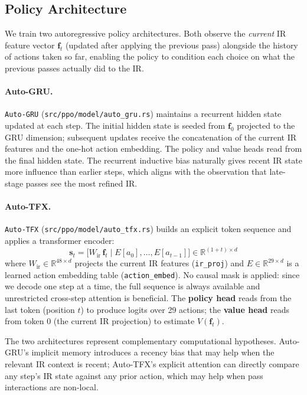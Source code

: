 \documentclass[conference]{IEEEtran}
\begin{document}
\subsection{Policy Architecture}
\label{sec:arch}
We train two autoregressive policy architectures.
Both observe the \emph{current} IR feature vector $\mathbf{f}_t$ (updated
after applying the previous pass) alongside the history of actions taken so
far, enabling the policy to condition each choice on what the previous passes
actually did to the IR.

\paragraph{Auto-GRU.}
\texttt{Auto-GRU} (\texttt{src/ppo/model/auto\_gru.rs}) maintains a recurrent
hidden state updated at each step.
The initial hidden state is seeded from $\mathbf{f}_0$ projected to the GRU
dimension; subsequent updates receive the concatenation of the current IR
features and the one-hot action embedding.
The policy and value heads read from the final hidden state.
The recurrent inductive bias naturally gives recent IR state more influence
than earlier steps, which aligns with the observation that late-stage passes
see the most refined IR.

\paragraph{Auto-TFX.}
\texttt{Auto-TFX} (\texttt{src/ppo/model/auto\_tfx.rs}) builds an explicit
token sequence and applies a transformer encoder:
%
\begin{equation}
\mathbf{s}_t = \bigl[W_{\text{ir}}\,\mathbf{f}_t \;\big|\;
               E[a_0], \ldots, E[a_{t-1}]\bigr]
               \in \mathbb{R}^{(1+t)\times d}
\label{eq:tokens}
\end{equation}
%
where $W_{\text{ir}} \in \mathbb{R}^{48 \times d}$ projects the current IR
features (\texttt{ir\_proj}) and $E \in \mathbb{R}^{29 \times d}$
is a learned action embedding table (\texttt{action\_embed}).
No causal mask is applied: since we decode one step at a time, the full
sequence is always available and unrestricted cross-step attention is
beneficial.
The \textbf{policy head} reads from the last token (position $t$) to produce
logits over 29 actions; the \textbf{value head} reads from token 0 (the
current IR projection) to estimate $V(\mathbf{f}_t)$.

The two architectures represent complementary computational hypotheses.
Auto-GRU's implicit memory introduces a recency bias that may help when the
relevant IR context is recent; Auto-TFX's explicit attention can directly
compare any step's IR state against any prior action, which may help when
pass interactions are non-local.
\end{document}
